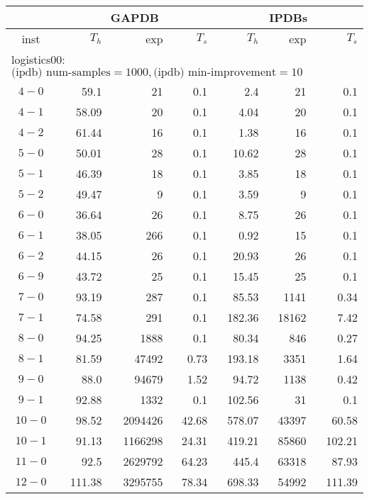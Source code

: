\begin{longtable}{|c||r|r|r||r|r|r|}\firsthline
& \multicolumn{3}{c||}{GAPDB} & \multicolumn{3}{c||}{IPDBs}\\\hline
inst & $T_h$ & exp & $T_s$ & $T_h$ & exp & $T_s$\\\hline
\multicolumn{7}{|l|}{logistics00: $\text{(ipdb) num-samples}=1000,\text{(ipdb) min-improvement}=10$}\\\hline
$4-0$ & 59.1 & 21 & 0.1 &2.4 & 21 & 0.1 \\\hline
$4-1$ & 58.09 & 20 & 0.1 &4.04 & 20 & 0.1 \\\hline
$4-2$ & 61.44 & 16 & 0.1 &1.38 & 16 & 0.1 \\\hline
$5-0$ & 50.01 & 28 & 0.1 &10.62 & 28 & 0.1 \\\hline
$5-1$ & 46.39 & 18 & 0.1 &3.85 & 18 & 0.1 \\\hline
$5-2$ & 49.47 & 9 & 0.1 &3.59 & 9 & 0.1 \\\hline
$6-0$ & 36.64 & 26 & 0.1 &8.75 & 26 & 0.1 \\\hline
$6-1$ & 38.05 & 266 & 0.1 &0.92 & 15 & 0.1 \\\hline
$6-2$ & 44.15 & 26 & 0.1 &20.93 & 26 & 0.1 \\\hline
$6-9$ & 43.72 & 25 & 0.1 &15.45 & 25 & 0.1 \\\hline
$7-0$ & 93.19 & 287 & 0.1 &85.53 & 1141 & 0.34 \\\hline
$7-1$ & 74.58 & 291 & 0.1 &182.36 & 18162 & 7.42 \\\hline
$8-0$ & 94.25 & 1888 & 0.1 &80.34 & 846 & 0.27 \\\hline
$8-1$ & 81.59 & 47492 & 0.73 &193.18 & 3351 & 1.64 \\\hline
$9-0$ & 88.0 & 94679 & 1.52 &94.72 & 1138 & 0.42 \\\hline
$9-1$ & 92.88 & 1332 & 0.1 &102.56 & 31 & 0.1 \\\hline
$10-0$ & 98.52 & 2094426 & 42.68 &578.07 & 43397 & 60.58 \\\hline
$10-1$ & 91.13 & 1166298 & 24.31 &419.21 & 85860 & 102.21 \\\hline
$11-0$ & 92.5 & 2629792 & 64.23 &445.4 & 63318 & 87.93 \\\hline
$12-0$ & 111.38 & 3295755 & 78.34 &698.33 & 54992 & 111.39 \\\hline


\end{longtable}
